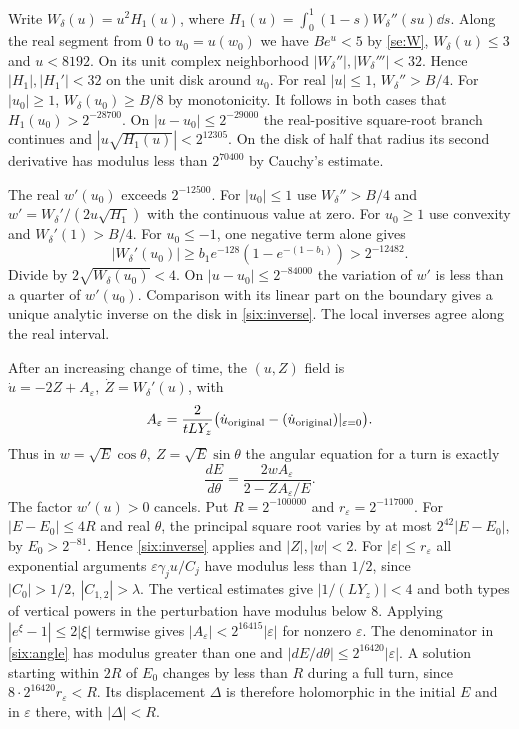 Write \(W_\delta(u)=u^2 H_1(u)\), where
\(H_1(u)=\int_0^1(1-s)W_\delta''(su)\dd s\). Along the real segment
from 0 to \(u_0=u(w_0)\) we have \(B e^u<5\) by \eqref{se:W},
\(W_\delta(u)\le3\) and \(u<8192\). On its unit complex neighborhood
\(|W_\delta''|,|W_\delta'''|<32\). Hence \(|H_1|,|H_1'|<32\)
on the unit disk around \(u_0\). For real \(|u|\le1\),
\(W_\delta''>B/4\). For \(|u_0|\ge1\),
\(W_\delta(u_0)\ge B/8\) by monotonicity. It follows in both cases that
\(H_1(u_0)>2^{-28700}\). On \(|u-u_0|\le2^{-29000}\) the real-positive
square-root branch continues and \(|u\sqrt{H_1(u)}|<2^{12305}\).
On the disk of half that radius its second derivative has modulus
less than \(2^{70400}\) by Cauchy's estimate.

The real \(w'(u_0)\) exceeds \(2^{-12500}\). For \(|u_0|\le1\) use
\(W_\delta''>B/4\) and \(w'=W_\delta'/(2u\sqrt{H_1})\) with the
continuous value at zero. For \(u_0\ge1\) use convexity and
\(W_\delta'(1)>B/4\). For \(u_0\le-1\), one negative term alone gives
\[
 |W_\delta'(u_0)|\ge b_1 e^{-128}(1-e^{-(1-b_1)})>2^{-12482}.
\]
Divide by \(2\sqrt{W_\delta(u_0)}<4\). On \(|u-u_0|\le2^{-84000}\)
the variation of \(w'\) is less than a quarter of \(w'(u_0)\).
Comparison with its linear part on the boundary gives a unique analytic
inverse on the disk in \eqref{six:inverse}. The local inverses agree along
the real interval.

After an increasing change of time, the \((u,Z)\) field is
\(\dot u=-2Z+A_\varepsilon,\ \dot Z=W_\delta'(u)\), with
\[
 A_\varepsilon=\frac{2}{t L Y_z}
          \big(\dot u_{\rm original}-(\dot u_{\rm original})|_{\varepsilon=0}\big).
\]
Thus in \(w=\sqrt E\cos\theta,\ Z=\sqrt E\sin\theta\) the angular
equation for a turn is exactly
\begin{equation}
              \frac{dE}{d\theta}=\frac{2wA_\varepsilon}{2-ZA_\varepsilon/E}.
                                                                        \label{six:angle}
\end{equation}
The factor \(w'(u)>0\) cancels. Put \(R=2^{-100000}\) and
\(r_\varepsilon=2^{-117000}\).
For \(|E-E_0|\le4R\) and real \(\theta\), the principal square root
varies by at most \(2^{42}|E-E_0|\), by \(E_0>2^{-81}\).
Hence \eqref{six:inverse} applies and \(|Z|,|w|<2\).
For \(|\varepsilon|\le r_\varepsilon\) all exponential arguments
\(\varepsilon\gamma_j u/C_j\) have modulus less than \(1/2\), since
\(|C_0|>1/2,\ |C_{1,2}|>\lambda\).
The vertical estimates give \(|1/(LY_z)|<4\) and both types of vertical
powers in the perturbation have modulus below 8. Applying
\(|e^\xi-1|\le2|\xi|\) termwise gives
\(|A_\varepsilon|<2^{16415}|\varepsilon|\) for nonzero \(\varepsilon\).
The denominator in \eqref{six:angle} has modulus greater than one and
\(|dE/d\theta|\le2^{16420}|\varepsilon|\). A solution starting within
\(2R\) of \(E_0\) changes by less than \(R\) during a full turn, since
\(8\cdot2^{16420} r_\varepsilon<R\).
Its displacement \(\Delta\) is therefore holomorphic in the initial
\(E\) and in \(\varepsilon\) there, with \(|\Delta|<R\).

